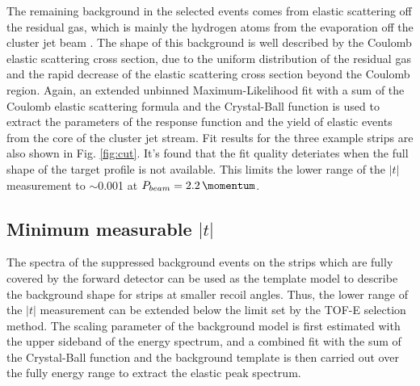 \documentclass[number,5p]{elsarticle}
\begin{document}
The remaining background in the selected events comes from elastic scattering
off the residual gas, which is mainly the hydrogen atoms from the evaporation
off the cluster jet beam \cite{cluster_target}.
The shape of this background is well described by the Coulomb elastic scattering cross
section, due to the uniform distribution of the residual gas and the rapid decrease of the elastic scattering cross section beyond the Coulomb region.
Again, an extended unbinned Maximum-Likelihood fit with a sum of the Coulomb elastic scattering formula and the Crystal-Ball
function is used to extract the parameters of the response function and the
yield of elastic events from the core of the cluster jet stream. 
Fit results for the three example strips are also shown in Fig. \ref{fig:cut}.
It's found that the fit quality deteriates when the full shape of the target profile is not available.
This limits the lower range of the $|t|$ measurement to $\sim$\SI{0.001}{\tmom} at $P_{beam}=\SI{2.2}{\momentum}$.

\subsection{Minimum measurable $|t|$}
\label{sec:minimum_t}
The spectra of the suppressed background events on the strips which are fully covered by the
forward detector can be used as the template model to describe the background
shape for strips at smaller recoil angles.
Thus, the lower range of the $|t|$ measurement can be extended below the limit set by the TOF-E selection method.
The scaling parameter of the background model is first estimated with the upper
sideband of the energy spectrum, and a combined fit with the sum of the Crystal-Ball function and the background template is then carried
out over the fully energy range to extract the elastic peak spectrum.
\end{document}
